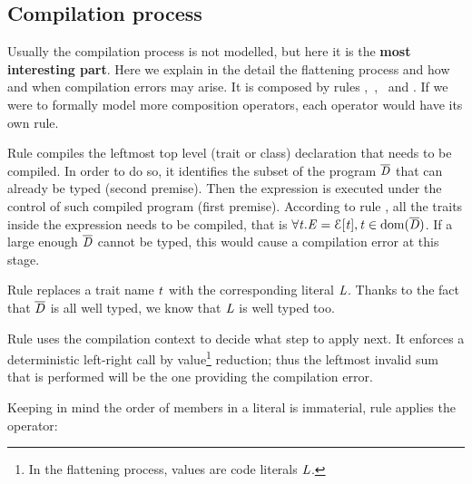 \subsection{Compilation process}

Usually the compilation process is not modelled, but here it is the \textbf{most interesting part}.
Here we explain in the detail the flattening process and how and when compilation errors may arise.
It is composed by rules ,\ ,\  and .
If we were to formally model more composition operators, each operator would have its own  rule.

Rule 
compiles the leftmost top level (trait or class) declaration that needs to be compiled.
In order to do so,
it identifies the subset of the program $\overline{\mathit{D}}$ that can already be typed (second premise).
Then the expression is executed under the control of such compiled program (first premise).
According to rule , all the traits inside the expression needs to
be compiled, that is $\forall\mathit{t}. \mathit{E}={\cal{E}}[\mathit{t}], \mathit{t}\in\text{dom}(\overline{\mathit{D}})$.
If a large enough $\overline{\mathit{D}}$ cannot be typed, this would cause a compilation error
at this stage.

Rule 
replaces a trait name $\mathit{t}$ with the corresponding literal $\mathit{L}$.
Thanks to the fact that $\overline{\mathit{D}}$ is all well typed, we know that $\mathit{L}$ is well typed too.

Rule 
uses the compilation context to decide what step to apply next.
It enforces a deterministic left-right call by value\footnote{
In the flattening process, values are code literals $\mathit{L}$.} reduction;
thus the leftmost invalid sum that is performed will be the one providing the compilation error.

Keeping in mind the order of members in a literal is immaterial, rule 
applies the operator:

